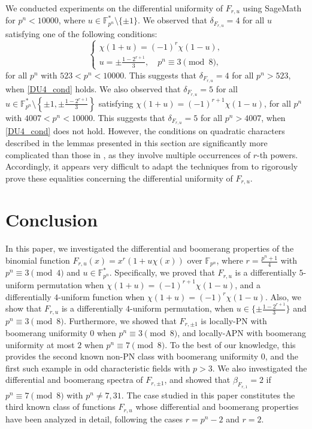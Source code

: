 \documentclass[11pt]{article}
\numberwithin{theorem}{section}
\newcommand{\Fpn}{\mathbb{F}_{p^n}}
\newcommand{\Fpnmul}{\mathbb{F}_{p^n}^*}
\begin{document}
We conducted experiments on the differential uniformity of $F_{r,u}$ using SageMath for $p^n < 10000$, where $u \in \Fpnmul \setminus \{\pm 1\}$. We observed that $\delta_{F_{r,u}} = 4$ for all $u$ satisfying one of the following conditions:
	\begin{equation}\label{DU4_cond}
		\begin{cases}
			\chi(1+u) = (-1)^r \chi(1 - u),\\
			u=\pm \frac{1-2^{r+1}}{3}, \quad p^n \equiv 3 \pmod{8},
		\end{cases}
	\end{equation}
for all $p^n$ with $523 < p^n < 10000$. This suggests that $\delta_{F_{r,u}} = 4$ for all $p^n > 523$, when \eqref{DU4_cond} holds. We also observed that $\delta_{F_{r,u}} = 5$ for all $u \in \Fpnmul \setminus \left\{\pm 1, \pm \frac{1 - 2^{r+1}}{3}\right\}$ satisfying $\chi(1+u) = (-1)^{r+1} \chi(1 - u)$, for all $p^n$ with $4007 < p^n < 10000$. This suggests that $\delta_{F_{r,u}} = 5$ for all $p^n > 4007$, when \eqref{DU4_cond} does not hold. However, the conditions on quadratic characters described in the lemmas presented in this section are significantly more complicated than those in \cite{XBC+24, XLB+24, MW25}, as they involve multiple occurrences of $r$-th powers. Accordingly, it appears very difficult to adapt the techniques from \cite{XBC+24, XLB+24, MW25} to rigorously prove these equalities concerning the differential uniformity of $F_{r,u}$.


\section{Conclusion}\label{sec_con}

In this paper, we investigated the differential and boomerang properties of the binomial function $F_{r,u}(x) = x^r(1 + u \chi(x) )$ over $\Fpn$, where $r = \frac{p^n+1}{4}$ with $p^n \equiv 3 \pmod{4}$ and $u\in \Fpnmul$. Specifically, we proved that $F_{r,u}$ is a differentially $5$-uniform permutation when $\chi(1+u) = (-1)^{r+1} \chi(1-u)$, and a differentially $4$-uniform function when $\chi(1+u) = (-1)^r \chi(1-u)$. Also, we show that $F_{r,u}$ is a differentially $4$-uniform permutation, when $u\in \{\pm \frac{1-2^{r+1}}{3}\}$ and $p^n\equiv 3 \pmod{8}$. Furthermore, we showed that $F_{r,\pm1}$ is locally-PN with boomerang uniformity $0$ when $p^n \equiv 3 \pmod{8}$, and locally-APN with boomerang uniformity at most $2$ when $p^n \equiv 7 \pmod{8}$. To the best of our knowledge, this provides the second known non-PN class with boomerang uniformity $0$, and the first such example in odd characteristic fields with $p > 3$. We also investigated the differential and boomerang spectra of $F_{r,\pm 1}$, and showed that $\beta_{F_{r,1}}=2$ if $p^n \equiv 7 \pmod{8}$ with $p^n \ne 7, 31$. The case studied in this paper constitutes the third known class of functions $F_{r,u}$ whose differential and boomerang properties have been analyzed in detail, following the cases $r = p^n - 2$ and $r = 2$.
\end{document}
